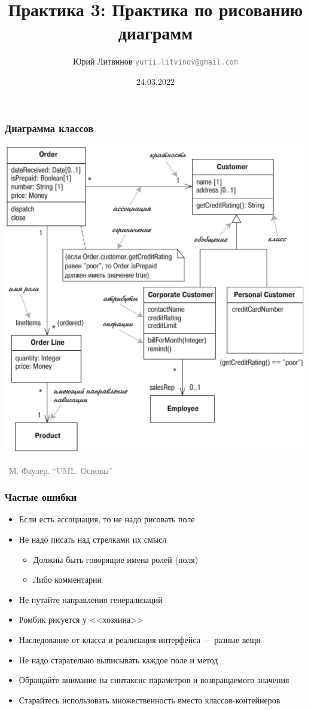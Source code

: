 \documentclass[xetex,mathserif,serif]{beamer}
\title{Практика 3: Практика по рисованию диаграмм}
\author[Юрий Литвинов]{Юрий Литвинов \newline \textcolor{gray}{\small\texttt{yurii.litvinov@gmail.com}}}
\date{24.03.2022}
\newcommand{\attribution}[1] {
    \vspace{-5mm}\begin{flushright}\begin{scriptsize}\textcolor{gray}{\textcopyright\, #1}\end{scriptsize}\end{flushright}
}
\begin{document}
    \frame{\titlepage}

    \begin{frame}
        \frametitle{Диаграмма классов}
        \begin{center}
            \includegraphics[height=0.8\textheight]{umlClassDiagram.png}
            \attribution{М. Фаулер. ``UML. Основы''}
        \end{center}
    \end{frame}

    \begin{frame}
        \frametitle{Частые ошибки}
        \begin{itemize}
            \item Если есть ассоциация, то не надо рисовать поле
            \item Не надо писать над стрелками их смысл
            \begin{itemize}
                \item Должны быть говорящие имена ролей (поля)
                \item Либо комментарии
            \end{itemize}
            \item Не путайте направления генерализаций
            \item Ромбик рисуется у <<хозяина>>
            \item Наследование от класса и реализация интерфейса --- разные вещи
            \item Не надо старательно выписывать каждое поле и метод
            \item Обращайте внимание на синтаксис параметров и возвращаемого значения
            \item Старайтесь использовать множественность вместо классов-контейнеров
        \end{itemize}
    \end{frame}
\end{document}
